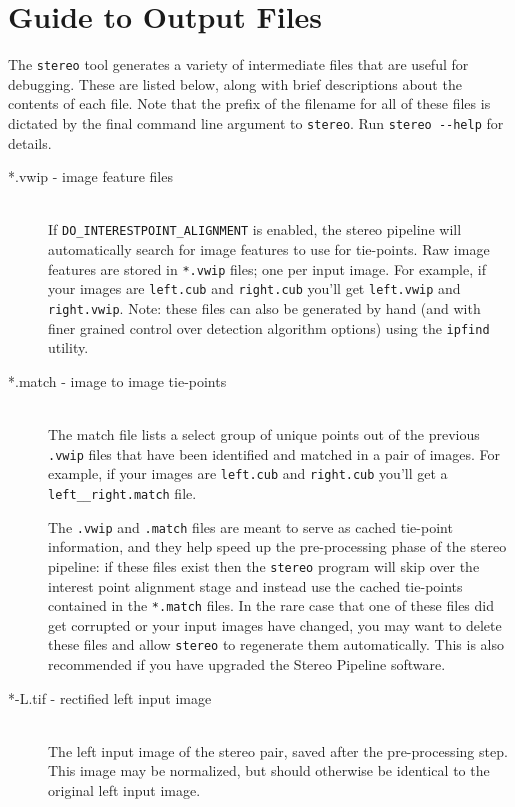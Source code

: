 \chapter{Guide to Output Files}
\label{chapter:outputfiles}

The {\tt stereo} tool generates a variety of intermediate files that
are useful for debugging.  These are listed below, along with brief
descriptions about the contents of each file.  Note that the prefix of
the filename for all of these files is dictated by the final command
line argument to {\tt stereo}.  Run {\tt stereo -\/-help} for details.

\begin{description}

\item[*.vwip \textnormal{- image feature files}] \hfill \\ 
  If \texttt{DO\_INTERESTPOINT\_ALIGNMENT} is enabled, the stereo pipeline will
  automatically search for image features to use for tie-points.  Raw
  image features are stored in \texttt{*.vwip} files; one per input image. For
  example, if your images are \texttt{left.cub} and \texttt{right.cub}
  you'll get \texttt{left.vwip} and \texttt{right.vwip}.  Note: these
  files can also be generated by hand (and with finer grained control
  over detection algorithm options) using the {\tt ipfind} utility.

\item[*.match \textnormal{- image to image tie-points}] \hfill \\ 
  The match file lists a select group of unique points out of the
  previous \texttt{.vwip} files that have been identified and matched
  in a pair of images.  For example, if your images are
  \texttt{left.cub} and \texttt{right.cub} you'll get a
  \texttt{left\_\_right.match} file.  

  The \texttt{.vwip} and \texttt{.match} files are meant to serve
  as cached tie-point information, and they help speed up the
  pre-processing phase of the stereo pipeline: if these files exist
  then the \texttt{stereo} program will skip over the interest point
  alignment stage and instead use the cached tie-points contained
  in the \texttt{*.match} files.  In the rare case that one of these files
  did get corrupted or your input images have changed, you may want
  to delete these files and allow {\tt stereo} to regenerate them
  automatically.  This is also recommended if you have upgraded the
  Stereo Pipeline software.

\item[*-L.tif - \textnormal{rectified left input image}] \hfill \\ 
  The left input image of the stereo pair, saved after the
  pre-processing step.  This image may be normalized, but should
  otherwise be identical to the original left input image.


\end{description}
